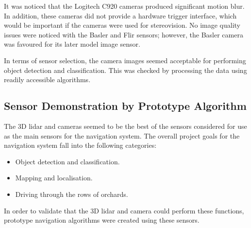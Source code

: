 \documentclass[preprint,authoryear,12pt]{elsarticle}
\begin{document}
        It was noticed that the Logitech C920 cameras produced significant motion blur.
    	In addition, these cameras did not provide a hardware trigger interface, which would be important if the cameras were used for stereovision.
    	No image quality issues were noticed with the Basler and Flir sensors; however, the Basler camera was favoured for its later model image sensor.

        In terms of sensor selection, the camera images seemed acceptable for performing object detection and classification.
    	This was checked by processing the data using readily accessible algorithms.



\subsection{Sensor Demonstration by Prototype Algorithm}
    The 3D lidar and cameras seemed to be the best of the sensors considered for use as the main sensors for the navigation system.
	The overall project goals for the navigation system fall into the following categories:
    \begin{itemize}
    \item Object detection and classification.
    \item Mapping and localisation.
    \item Driving through the rows of orchards.
    \end{itemize}
    In order to validate that the 3D lidar and camera could perform these functions, prototype navigation algorithms were created using these sensors.
\end{document}
